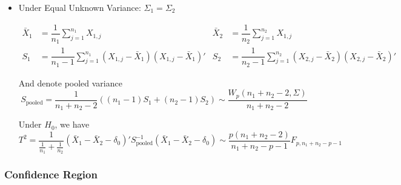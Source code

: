 \begin{itemize}[topsep=2pt,itemsep=2pt]
\begin{itemize}[topsep=2pt,itemsep=2pt]
        \item Under Equal Unknown Variance: $ \Sigma_1=\Sigma_2 $
        
        \begin{align}
            \bar{X}_1&=\dfrac{1}{n_1}\sum_{j=1}^{n_1} X_{1,j}&\bar{X}_2&=\dfrac{1}{n_2}\sum_{j=1}^{n_2} X_{1,j}\\
            S_1&=\dfrac{1}{n_1-1}\sum_{j=1}^{n_1}(X_{1,j}-\bar{X}_1)(X_{1,j}-\bar{X}_1)'&S_2&=\dfrac{1}{n_2-1}\sum_{j=1}^{n_2}(X_{2,j}-\bar{X}_2)(X_{2,j}-\bar{X}_2)'
        \end{align}
        
        And denote pooled variance
        \begin{equation}\label{EqaPooledVariance}
            S_\mathrm{pooled}=\dfrac{1}{n_1+n_2-2}\left((n_1-1)S_1+(n_2-1)S_2 \right)  \sim \dfrac{W_p(n_1+n_2-2,\Sigma )}{n_1+n_2-2}
        \end{equation}
        
        
        Under $ H_0 $, we have 
        \begin{equation}
            T^2= \dfrac{1}{\frac{1}{n_1}+\frac{1}{n_2}}(\bar{X}_1-\bar{X}_2-\delta _0)'S_\mathrm{pooled}^{-1}(\bar{X}_1-\bar{X}_2-\delta _0)\sim \dfrac{p(n_1+n_2-2)}{n_1+n_2-p-1}F_{p,n_1+n_2-p-1}
        \end{equation}
        

    \end{itemize}
    
    


\end{itemize}




    


\subsubsection{Confidence Region}

